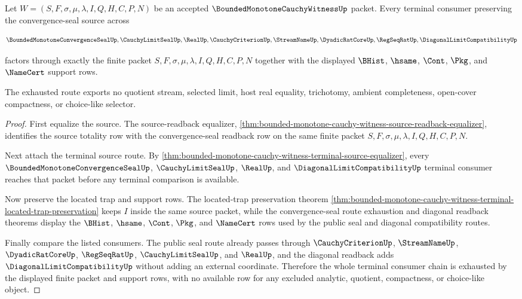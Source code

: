 \begin{theorem}
\label{thm:bounded-monotone-cauchy-witness-l10-terminal-route-exhaustion}
Let $W=(S,F,\sigma,\mu,\lambda,I,Q,H,C,P,N)$ be an accepted $\BoundedMonotoneCauchyWitnessUp$ packet. Every terminal consumer preserving the convergence-seal source across

$$
\BoundedMonotoneConvergenceSealUp,\CauchyLimitSealUp,\RealUp,\CauchyCriterionUp,\StreamNameUp,\DyadicRatCoreUp,\RegSeqRatUp,\DiagonalLimitCompatibilityUp
$$

factors through exactly the finite packet $S,F,\sigma,\mu,\lambda,I,Q,H,C,P,N$ together with the displayed $\BHist$, $\hsame$, $\Cont$, $\Pkg$, and $\NameCert$ support rows.

The exhausted route exports no quotient stream, selected limit, host real equality, trichotomy, ambient completeness, open-cover compactness, or choice-like selector.
\end{theorem}
\begin{proof}
First equalize the source. The source-readback equalizer, \autoref{thm:bounded-monotone-cauchy-witness-source-readback-equalizer}, identifies the source totality row with the convergence-seal readback row on the same finite packet $S,F,\sigma,\mu,\lambda,I,Q,H,C,P,N$.

Next attach the terminal source route. By \autoref{thm:bounded-monotone-cauchy-witness-terminal-source-equalizer}, every $\BoundedMonotoneConvergenceSealUp$, $\CauchyLimitSealUp$, $\RealUp$, and $\DiagonalLimitCompatibilityUp$ terminal consumer reaches that packet before any terminal comparison is available.

Now preserve the located trap and support rows. The located-trap preservation theorem \autoref{thm:bounded-monotone-cauchy-witness-terminal-located-trap-preservation} keeps $I$ inside the same source packet, while the convergence-seal route exhaustion and diagonal readback theorems display the $\BHist$, $\hsame$, $\Cont$, $\Pkg$, and $\NameCert$ rows used by the public seal and diagonal compatibility routes.

Finally compare the listed consumers. The public seal route already passes through $\CauchyCriterionUp$, $\StreamNameUp$, $\DyadicRatCoreUp$, $\RegSeqRatUp$, $\CauchyLimitSealUp$, and $\RealUp$, and the diagonal readback adds $\DiagonalLimitCompatibilityUp$ without adding an external coordinate. Therefore the whole terminal consumer chain is exhausted by the displayed finite packet and support rows, with no available row for any excluded analytic, quotient, compactness, or choice-like object.
\end{proof}

